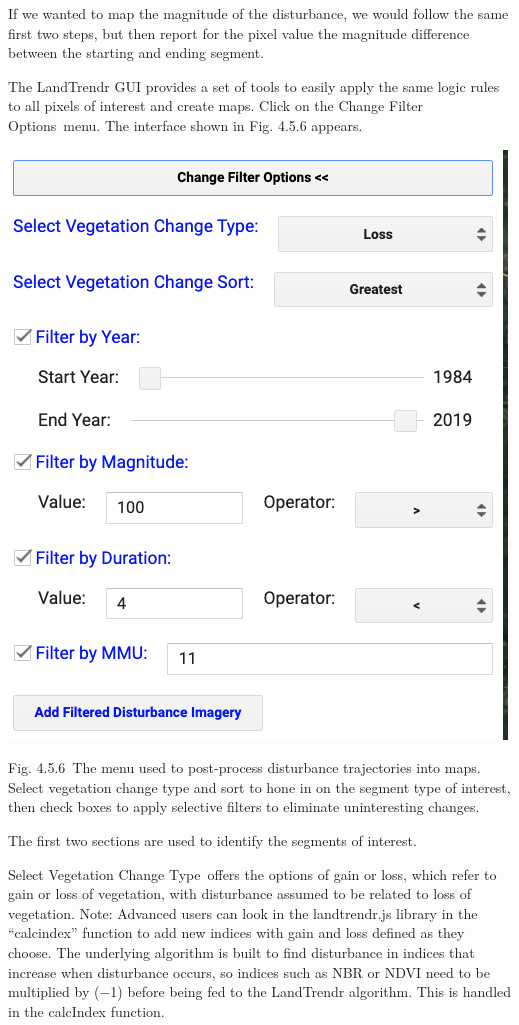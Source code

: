 \documentclass[
  letterpaper,
  DIV=11,
  numbers=noendperiod]{scrreprt}
\begin{document}
If we wanted to map the magnitude of the disturbance, we would follow
the same first two steps, but then report for the pixel value the
magnitude difference between the starting and ending segment.

The LandTrendr GUI provides a set of tools to easily apply the same
logic rules to all pixels of interest and create maps. Click on the
Change Filter Options~menu. The interface shown in Fig. 4.5.6 appears.

\includegraphics{./F4/image49.png}

Fig. 4.5.6~The menu used to post-process disturbance trajectories into
maps. Select vegetation change type and sort to hone in on the segment
type of interest, then check boxes to apply selective filters to
eliminate uninteresting changes. ~

The first two sections are used to identify the segments of interest. ~

Select Vegetation Change Type~offers the options of gain or loss, which
refer to gain or loss of vegetation, with disturbance assumed to be
related to loss of vegetation. Note: Advanced users can look in the
landtrendr.js library in the ``calcindex'' function to add new indices
with gain and loss defined as they choose. The underlying algorithm is
built to find disturbance in indices that increase when disturbance
occurs, so indices such as NBR or NDVI need to be multiplied by (−1)
before being fed to the LandTrendr algorithm. This is handled in the
calcIndex function.
\end{document}
